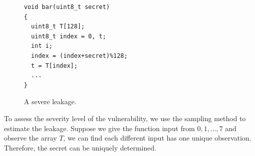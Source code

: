 \begin{figure}[h]
  \begin{minipage}{0.49\linewidth}
    \begin{lstlisting}[xleftmargin=.05\textwidth,xrightmargin=.08\textwidth]
void bar(uint8_t secret)
{
  uint8_t T[128];
  uint8_t index = 0, t;
  int i;
  index = (index+secret)%128;
  t = T[index];
  ...
}
\end{lstlisting}
  \end{minipage}
  \hfill
  \begin{minipage}{0.42\linewidth}
  \end{minipage}
  \caption{A severe leakage.}\label{chapter5:fig:example1}
\end{figure}

To assess the severity level of the vulnerability, we use the sampling method to estimate the leakage. Suppose we give the function input from $0, 1, \dots, 7$ and observe the array $T$, we can find each different input has one unique observation. Therefore, the secret can be uniquely determined.

